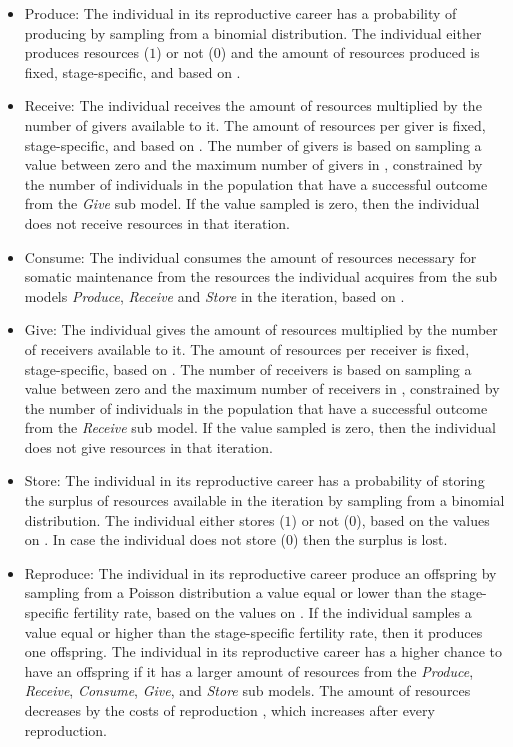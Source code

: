 \documentclass{article}
\begin{document}
\begin{itemize}
\begin{itemize}
        \item Produce: The individual in its reproductive career has a probability of producing by sampling from a binomial distribution. The individual either produces resources ($1$) or not ($0$) and the amount of resources produced is fixed, stage-specific, and based on \cite{koster2020life}.
        \item Receive: The individual receives the amount of resources multiplied by the number of givers available to it. The amount of resources per giver is fixed, stage-specific, and based on \cite{gurven2004give}. The number of givers is based on sampling a value between zero and the maximum number of givers in \cite{gurven2004give}, constrained by the number of individuals in the population that have a successful outcome from the \emph{Give} sub model. If the value sampled is zero, then the individual does not receive resources in that iteration. 
        \item Consume: The individual consumes the amount of resources necessary for somatic maintenance from the resources the individual acquires from the sub models \emph{Produce}, \emph{Receive} and \emph{Store} in the iteration, based on \cite{kaplan2000theory, pontzer2021daily}.
        \item Give: The individual gives the amount of resources multiplied by the number of receivers available to it. The amount of resources per receiver is fixed, stage-specific, based on \cite{gurven2004give}. The number of receivers is based on sampling a value between zero and the maximum number of receivers in \cite{gurven2004give}, constrained by the number of individuals in the population that have a successful outcome from the \emph{Receive} sub model. If the value sampled is zero, then the individual does not give resources in that iteration.
        \item Store: The individual in its reproductive career has a probability of storing the surplus of resources available in the iteration by sampling from a binomial distribution. The individual either stores ($1$) or not ($0$), based on the values on \citep{bowles2011cultivation}. In case the individual does not store ($0$) then the surplus is lost.
        \item Reproduce: The individual in its reproductive career produce an offspring by sampling from a Poisson distribution a value equal or lower than the stage-specific fertility rate, based on the values on \citep{wood2017dynamics}. If the individual samples a value equal or higher than the stage-specific fertility rate, then it produces one offspring. The individual in its reproductive career has a higher chance to have an offspring if it has a larger amount of resources from the \emph{Produce}, \emph{Receive}, \emph{Consume}, \emph{Give}, and \emph{Store} sub models. The amount of resources decreases by the costs of reproduction \citep{wood2017dynamics}, which increases after every reproduction.

\end{itemize}
\end{itemize}
\end{document}
